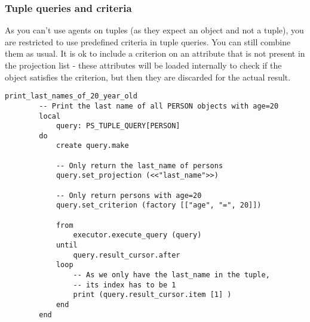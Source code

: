 \subsubsection{Tuple queries and criteria}
As you can't use agents on tuples (as they expect an object and not a tuple), you are restricted to use predefined criteria in tuple queries. You can still combine them as usual.
It is ok to include a criterion on an attribute that is not present in the projection list - these attributes will be loaded internally to check if the object satisfies the criterion, but then they are discarded for the actual result.

\begin{lstlisting}[language=OOSC2Eiffel, captionpos=b, caption={}, label={lst:tuple_projection_selection}]
	print_last_names_of_20_year_old
		-- Print the last name of all PERSON objects with age=20
		local
			query: PS_TUPLE_QUERY[PERSON]
		do
			create query.make

			-- Only return the last_name of persons
			query.set_projection (<<"last_name">>)

			-- Only return persons with age=20
			query.set_criterion (factory [["age", "=", 20]])

			from
				executor.execute_query (query)
			until
				query.result_cursor.after
			loop
				-- As we only have the last_name in the tuple,
				-- its index has to be 1
				print (query.result_cursor.item [1] )
			end			
		end
\end{lstlisting}
